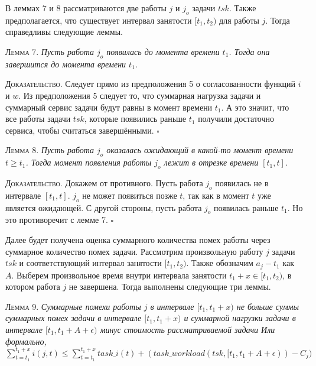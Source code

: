 В леммах 7 и 8 рассматриваются две работы $j$ и $j_o$ задачи $tsk$. Также предполагается, что существует интервал занятости $[t_1, t_2)$ для работы $j$. Тогда справедливы следующие леммы.

\textsc{Лемма 7.}
\textit{Пусть работа $j_o$ появилась до момента времени $t_1$. Тогда она завершится до момента времени $t_1$. }

\textsc{Доказательство.} Следует прямо из предположения 5 о согласованности функций $i$ и $w$.
  Из предположения 5 следует то, что суммарная нагрузка задачи и суммарный сервис
  задачи будут равны в момент времени $t_1$. А это значит, что все работы задачи $tsk$,
    которые появились раньше $t_1$ получили достаточно сервиса, чтобы считаться завершёнными. $\square$

\textsc{Лемма 8.}
\textit{Пусть работа $j_o$ оказалась ожидающий в какой-то момент времени $t \geq t_1$. Тогда момент появления работы $j_o$ лежит в отрезке времени $[t_1, t]$. }

\textsc{Доказательство.} Докажем от противного. Пусть работа $j_o$ появилась не в интервале $[t_1, t]$.
  $j_o$ не может появиться позже $t$, так как в момент $t$ уже является ожидающей.
  С другой стороны, пусть работа  $j_o$ появилась раньше $t_1$. Но это противоречит с лемме 7.
  $\square$

Далее будет получена оценка суммарного количества помех работы через суммарное количество
  помех задачи. Рассмотрим произвольную работу $j$ задачи $tsk$ и соответствующий
  интервал занятости $[t_1, t_2)$. Также обозначим $a_j - t_1$ как $A$. Выберем
  произвольное время внутри интервала занятости $t_1 + x \in [t_1, t_2)$,
  в котором работа $j$ не завершена. Тогда выполнены следующие три леммы.

\textsc{Лемма 9.}
\textit{Суммарные помехи работы $j$ в интервале $[t_1, t_1 + x)$ не больше суммы
    суммарных помех задачи в интервале $[t_1, t_1 + x)$ и
    суммарной нагрузки задачи в интервале $[t_1, t_1 + A + \epsilon)$
    минус стоимость рассматриваемой задачи
  Или формально,
   $\sum_{t = t_1}^{t_1 + x} i(j,t) \leq
     \sum_{t = t_1}^{t_1 + x} task\_i(t) + (task\_workload(tsk, [t_1, t_1 + A + \epsilon)) - C_{j})$ }

